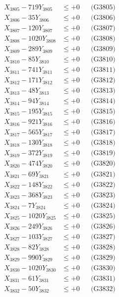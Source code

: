 \documentclass[a4paper,10pt]{article}
\begin{document}
{\begin{align}
X_{3805} - 719Y_{3805} &\leq +0 && \text{(G3805)} \\
X_{3806} - 35Y_{3806} &\leq +0 && \text{(G3806)} \\
X_{3807} - 120Y_{3807} &\leq +0 && \text{(G3807)} \\
X_{3808} - 1020Y_{3808} &\leq +0 && \text{(G3808)} \\
X_{3809} - 289Y_{3809} &\leq +0 && \text{(G3809)} \\
X_{3810} - 85Y_{3810} &\leq +0 && \text{(G3810)} \\
\allowbreak
X_{3811} - 741Y_{3811} &\leq +0 && \text{(G3811)} \\
X_{3812} - 171Y_{3812} &\leq +0 && \text{(G3812)} \\
X_{3813} - 48Y_{3813} &\leq +0 && \text{(G3813)} \\
X_{3814} - 94Y_{3814} &\leq +0 && \text{(G3814)} \\
X_{3815} - 195Y_{3815} &\leq +0 && \text{(G3815)} \\
X_{3816} - 921Y_{3816} &\leq +0 && \text{(G3816)} \\
X_{3817} - 565Y_{3817} &\leq +0 && \text{(G3817)} \\
X_{3818} - 130Y_{3818} &\leq +0 && \text{(G3818)} \\
X_{3819} - 372Y_{3819} &\leq +0 && \text{(G3819)} \\
X_{3820} - 474Y_{3820} &\leq +0 && \text{(G3820)} \\
\allowbreak
X_{3821} - 69Y_{3821} &\leq +0 && \text{(G3821)} \\
X_{3822} - 148Y_{3822} &\leq +0 && \text{(G3822)} \\
X_{3823} - 368Y_{3823} &\leq +0 && \text{(G3823)} \\
X_{3824} - 7Y_{3824} &\leq +0 && \text{(G3824)} \\
X_{3825} - 1020Y_{3825} &\leq +0 && \text{(G3825)} \\
X_{3826} - 249Y_{3826} &\leq +0 && \text{(G3826)} \\
X_{3827} - 103Y_{3827} &\leq +0 && \text{(G3827)} \\
X_{3828} - 82Y_{3828} &\leq +0 && \text{(G3828)} \\
X_{3829} - 990Y_{3829} &\leq +0 && \text{(G3829)} \\
X_{3830} - 1020Y_{3830} &\leq +0 && \text{(G3830)} \\
\allowbreak
X_{3831} - 61Y_{3831} &\leq +0 && \text{(G3831)} \\
X_{3832} - 50Y_{3832} &\leq +0 && \text{(G3832)} \\

\end{align}}
\end{document}
